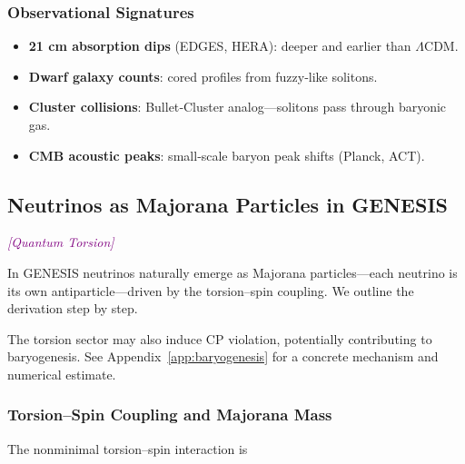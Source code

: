 \documentclass{article}
\newcommand{\quantumtag}{\textcolor{purple}{\textit{[Quantum Torsion]}}}
\begin{document}
\subsubsection{ Observational Signatures}
\begin{itemize}
  \item \textbf{21 cm absorption dips} (EDGES, HERA): deeper and earlier than $\Lambda$CDM.  
  \item \textbf{Dwarf galaxy counts}: cored profiles from fuzzy‐like solitons.  
  \item \textbf{Cluster collisions}: Bullet‐Cluster analog—solitons pass through baryonic gas.  
  \item \textbf{CMB acoustic peaks}: small‐scale baryon peak shifts (Planck, ACT).  
\end{itemize}

\medskip
\begin{center}
\end{center}
\medskip


\subsection{Neutrinos as Majorana Particles in GENESIS}
\label{subsec:majorana_neutrino}
\quantumtag


In GENESIS neutrinos naturally emerge as Majorana particles—each neutrino
is its own antiparticle—driven by the torsion–spin coupling.  We outline the
derivation step by step.

The torsion sector may also induce CP violation, potentially contributing to baryogenesis.
See Appendix~\ref{app:baryogenesis} for a concrete mechanism and numerical estimate.


\subsubsection{ Torsion–Spin Coupling and Majorana Mass}
The nonminimal torsion–spin interaction is
\end{document}
